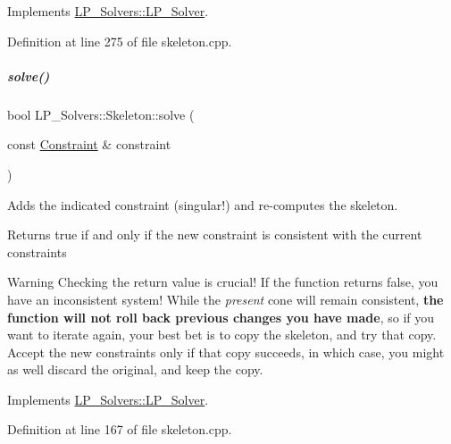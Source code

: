 Implements \hyperlink{group___c_l_s_solvers_aea1a5bf98a2c4c06b0550cacdf8b88fd}{L\+P\+\_\+\+Solvers\+::\+L\+P\+\_\+\+Solver}.



Definition at line 275 of file skeleton.\+cpp.

\mbox{\label{group___c_l_s_solvers_a202b0b37e0ea8a817ce6e29c93a39cd8}} 
\subparagraph{\texorpdfstring{solve()}{solve()}\hspace{0.1cm}{\footnotesize\ttfamily [2/2]}}
{\footnotesize\ttfamily bool L\+P\+\_\+\+Solvers\+::\+Skeleton\+::solve (\begin{DoxyParamCaption}\item[{const \hyperlink{group___c_l_s_solvers_class_l_p___solvers_1_1_constraint}{Constraint} \&}]{constraint }\end{DoxyParamCaption})\hspace{0.3cm}{\ttfamily [virtual]}}



Adds the indicated constraint (singular!) and re-\/computes the skeleton. 

\begin{DoxyReturn}{Returns}
{\ttfamily true} if and only if the new constraint is consistent with the current constraints
\end{DoxyReturn}
\begin{DoxyWarning}{Warning}
Checking the return value is crucial! If the function returns {\ttfamily false}, you have an inconsistent system! While the {\itshape present} cone will remain consistent, {\bfseries the function will not roll back previous changes you have made}, so if you want to iterate again, your best bet is to copy the skeleton, and try that copy. Accept the new constraints only if that copy succeeds, in which case, you might as well discard the original, and keep the copy. 
\end{DoxyWarning}


Implements \hyperlink{group___c_l_s_solvers_a8b9979fb228ac9ccfe037ad6ca48b314}{L\+P\+\_\+\+Solvers\+::\+L\+P\+\_\+\+Solver}.



Definition at line 167 of file skeleton.\+cpp.



